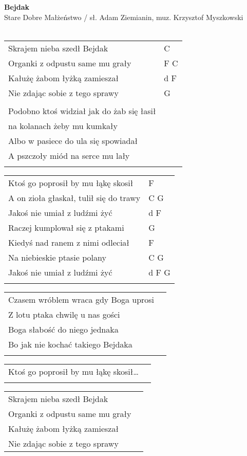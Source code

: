 \documentclass[a5paper]{article}
\begin{document}


\noindent
\fontsize{12pt}{15pt}\selectfont
\textbf{Bejdak} \\
\fontsize{8pt}{10pt}\selectfont
Stare Dobre Małżeństwo / sł. Adam Ziemianin, muz. Krzysztof Myszkowski \\ \\
\fontsize{10pt}{12pt}\selectfont
{}
\begin{tabular}{@{}p{8.5cm}p{3cm}@{}}
\noindent
Skrajem nieba szedł Bejdak & C \\
Organki z odpustu same mu grały & F C \\
Kałużę żabom łyżką zamieszał & d F \\
Nie zdając sobie z tego sprawy & G \\ \\

Podobno ktoś widział jak do żab się łasił \\
na kolanach żeby mu kumkały \\
Albo w pasiece do ula się spowiadał \\
A pszczoły miód na serce mu lały \\ \\
\end{tabular}

\noindent
\begin{tabular}{@{}p{7.5cm}p{3cm}@{}}
Ktoś go poprosił by mu łąkę skosił & F \\
A on zioła głaskał, tulił się do trawy & C G \\
Jakoś nie umiał z ludźmi żyć & d F \\
Raczej kumplował się z ptakami & G \\
Kiedyś nad ranem z nimi odleciał & F \\
Na niebieskie ptasie polany & C G \\
Jakoś nie umiał z ludźmi żyć & d F G \\ \\
\end{tabular}

\noindent
\begin{tabular}{@{}p{8.5cm}p{3cm}@{}}
Czasem wróblem wraca gdy Boga uprosi\\
Z lotu ptaka chwilę u nas gości\\
Boga słabość do niego jednaka\\
Bo jak nie kochać takiego Bejdaka\\\\
\end{tabular}

\noindent
\begin{tabular}{@{}p{8.5cm}p{3cm}@{}}
Ktoś go poprosił by mu łąkę skosił…\\\\
\end{tabular}

\noindent
\begin{tabular}{@{}p{8.5cm}p{3cm}@{}}
Skrajem nieba szedł Bejdak \\
Organki z odpustu same mu grały\\ 
Kałużę żabom łyżką zamieszał \\
Nie zdając sobie z tego sprawy
\end{tabular}
\end{document}
